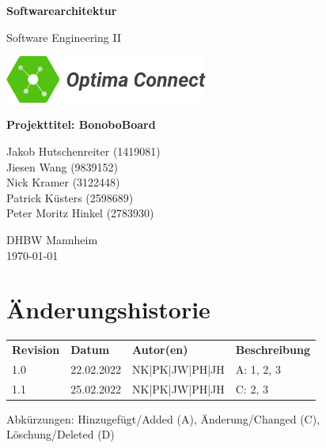 \documentclass[a4paper,11pt]{scrartcl}
\begin{document}
\renewcommand*{\arraystretch}{1.2}
\begin{titlepage}
    \begin{center}
        \vspace*{1cm}\Huge
        \textbf{Softwarearchitektur}\par
        \vspace{0.5cm}\LARGE        
        Software Engineering II\par           
        \vspace{2cm}
        \includegraphics[width=0.5\textwidth]{OptimaLogo_long}\par   
        \vspace{1cm}
        \textbf{Projekttitel: BonoboBoard}\par        
        \vfill\Large   
        Jakob Hutschenreiter (1419081)\\Jiesen Wang (9839152)\\Nick Kramer (3122448)\\Patrick Küsters (2598689)\\Peter Moritz Hinkel (2783930)\par
        \vspace{2cm}
        DHBW Mannheim\\
        \today     
    \end{center}
\end{titlepage}

\section*{Änderungshistorie}
\begin{table}[h]
	\begin{tabular}{@{} p{20mm} p{25mm} p{35mm} p{75mm}}
		\textbf{Revision} & \textbf{Datum} & \textbf{Autor(en)} & \textbf{Beschreibung}\\
		1.0 & 22.02.2022 & NK|PK|JW|PH|JH & A: 1, 2, 3\\
		1.1 & 25.02.2022 & NK|PK|JW|PH|JH & C: 2, 3\\
	\end{tabular}
\end{table}
\noindent
Abkürzungen: Hinzugefügt/Added (A), Änderung/Changed (C), Löschung/Deleted (D)
\vspace{2cm}
\tableofcontents
\newpage
{}
\end{document}
